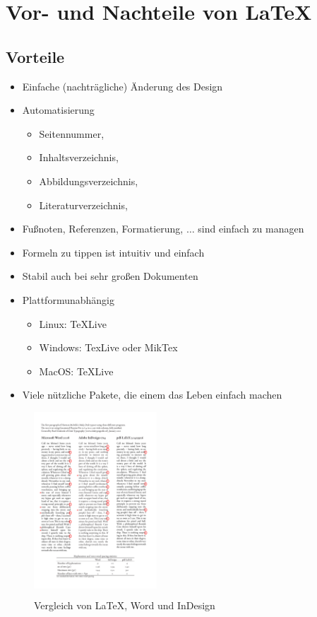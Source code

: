 \documentclass[
    ngerman,
    accentcolor=3b,
    dark_mode,
    fontsize= 12pt,
    a4paper,
    aspectratio=169,
    colorback=true,
    fancy_row_colors,
    leqno,
    fleqn,
    boxarc=3pt,
    fleqn,
    design=2008,
]{algoslides}
\begin{document}
    \section{Vor- und Nachteile von \LaTeX}\label{2}\label{2}
    \subsection{Vorteile}\label{2.1}\label{2.1}
    \begin{frame}
        \slidehead{}
        \begin{itemize}
            \item Einfache (nachträgliche) Änderung des Design
            \item Automatisierung
                \begin{itemize}
                    \item Seitennummer,
                    \item Inhaltsverzeichnis,
                    \item Abbildungsverzeichnis,
                    \item Literaturverzeichnis,
                \end{itemize}
            \item Fußnoten, Referenzen, Formatierung, $\dots$ sind einfach zu managen
            \item Formeln zu tippen ist intuitiv und einfach
            \item Stabil auch bei sehr großen Dokumenten
            \item Plattformunabhängig\begin{itemize}
                    \item Linux: TeXLive
                    \item Windows: TexLive oder MikTex
                    \item MacOS: TeXLive
                \end{itemize}
            \item Viele nützliche Pakete, die einem das Leben einfach machen
        \end{itemize}
    \end{frame}
    \begin{frame}[c]
        \begin{figure}[ht!]
            \centering
            \colorbox{white}{\includegraphics[height=6.5cm]{LaTeX vs Word vs Indesign.pdf}}
            \caption{Vergleich von \LaTeX, Word und InDesign}
            \label{fig:LaTeX-Vergleich}
        \end{figure}
    \end{frame}
\end{document}
